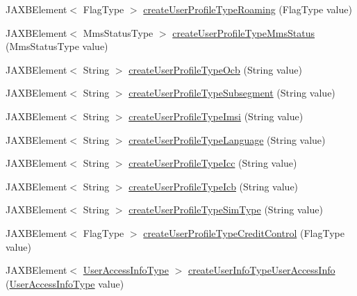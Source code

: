 \begin{DoxyCompactItemize}
\item 
JAXBElement$<$ FlagType $>$ \hyperlink{classcom_1_1telefonica_1_1schemas_1_1unica_1_1rest_1_1directory_1_1v1_1_1ObjectFactory_a7a878941e2310b46f84766f94f7fcd4e}{createUserProfileTypeRoaming} (FlagType value)
\item 
JAXBElement$<$ MmsStatusType $>$ \hyperlink{classcom_1_1telefonica_1_1schemas_1_1unica_1_1rest_1_1directory_1_1v1_1_1ObjectFactory_aa503d7f6fbdf1c35067a26ccfa36d50b}{createUserProfileTypeMmsStatus} (MmsStatusType value)
\item 
JAXBElement$<$ String $>$ \hyperlink{classcom_1_1telefonica_1_1schemas_1_1unica_1_1rest_1_1directory_1_1v1_1_1ObjectFactory_abe676f31e529bd311c988f33874aeaa5}{createUserProfileTypeOcb} (String value)
\item 
JAXBElement$<$ String $>$ \hyperlink{classcom_1_1telefonica_1_1schemas_1_1unica_1_1rest_1_1directory_1_1v1_1_1ObjectFactory_a06e6a9604e6a4074691874535828fe60}{createUserProfileTypeSubsegment} (String value)
\item 
JAXBElement$<$ String $>$ \hyperlink{classcom_1_1telefonica_1_1schemas_1_1unica_1_1rest_1_1directory_1_1v1_1_1ObjectFactory_a3f4eeee69aa6693582f93306ef305fe5}{createUserProfileTypeImsi} (String value)
\item 
JAXBElement$<$ String $>$ \hyperlink{classcom_1_1telefonica_1_1schemas_1_1unica_1_1rest_1_1directory_1_1v1_1_1ObjectFactory_a34dfa3ddd9e3f260e1db4109b416b6c4}{createUserProfileTypeLanguage} (String value)
\item 
JAXBElement$<$ String $>$ \hyperlink{classcom_1_1telefonica_1_1schemas_1_1unica_1_1rest_1_1directory_1_1v1_1_1ObjectFactory_ad39b09d95497cd4dc566ef0f7bd0f076}{createUserProfileTypeIcc} (String value)
\item 
JAXBElement$<$ String $>$ \hyperlink{classcom_1_1telefonica_1_1schemas_1_1unica_1_1rest_1_1directory_1_1v1_1_1ObjectFactory_abfd61107eb491a2c4357518690469605}{createUserProfileTypeIcb} (String value)
\item 
JAXBElement$<$ String $>$ \hyperlink{classcom_1_1telefonica_1_1schemas_1_1unica_1_1rest_1_1directory_1_1v1_1_1ObjectFactory_a0da78d19ee55d0419d43d4a27358e46e}{createUserProfileTypeSimType} (String value)
\item 
JAXBElement$<$ FlagType $>$ \hyperlink{classcom_1_1telefonica_1_1schemas_1_1unica_1_1rest_1_1directory_1_1v1_1_1ObjectFactory_a4d8546f255df36fe598c7e350266e74f}{createUserProfileTypeCreditControl} (FlagType value)
\item 
JAXBElement$<$ \hyperlink{classcom_1_1telefonica_1_1schemas_1_1unica_1_1rest_1_1directory_1_1v1_1_1UserAccessInfoType}{UserAccessInfoType} $>$ \hyperlink{classcom_1_1telefonica_1_1schemas_1_1unica_1_1rest_1_1directory_1_1v1_1_1ObjectFactory_a4edcb13df0f9eeeb98bb5ac62b1cd03f}{createUserInfoTypeUserAccessInfo} (\hyperlink{classcom_1_1telefonica_1_1schemas_1_1unica_1_1rest_1_1directory_1_1v1_1_1UserAccessInfoType}{UserAccessInfoType} value)

\end{DoxyCompactItemize}
